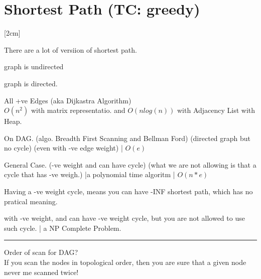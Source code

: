 \section{Shortest Path (TC: greedy)}

[2cm]

There are a lot of versiion of shortest path.
\begin{compactenum}
    \item graph is undirected
    \item graph is directed.
    \item All +ve Edges (aka Dijkastra Algorithm)\\$O(n^2)$ with matrix representatio. and $O(nlog(n))$ with Adjacency List with Heap.
    \item On DAG. (algo. Breadth First Scanning and Bellman Ford) (directed graph but no cycle) (even with -ve edge weight) | $O(e)$
    \item General Case. (-ve weight and can have cycle) (what we are not allowing is that a cycle that has -ve weigh.) |a polynomial time algoritm | $O(n*e)$
    
    Having a -ve weight cycle, means you can have -INF shortest path, which has no pratical meaning.

    \item with -ve weight, and can have -ve weight cycle, but you are not allowed to use such cycle. | a NP Complete Problem.
    
\end{compactenum}

\rule{\linewidth}{0.2em}

Order of scan for DAG?\\
If you scan the nodes in topological order, then you are sure that a given node never me scanned twice!

